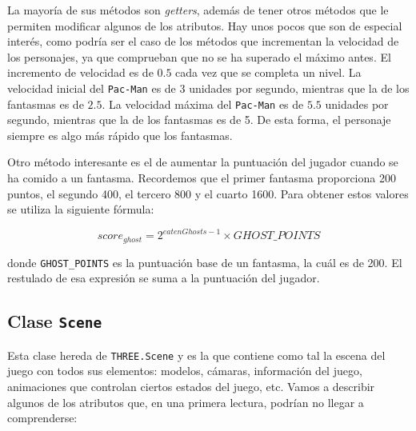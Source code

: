 \documentclass[11pt,a4paper]{article}
\begin{document}
La mayoría de sus métodos son \textit{getters}, además de tener otros métodos que le
permiten modificar algunos de los atributos. Hay unos pocos que son de especial interés, como
podría ser el caso de los métodos que incrementan la velocidad de los personajes, ya que
comprueban que no se ha superado el máximo antes. El incremento de velocidad es de $0.5$ cada
vez que se completa un nivel. La velocidad inicial del \texttt{Pac-Man} es de 3 unidades por
segundo, mientras que la de los fantasmas es de $2.5$. La velocidad máxima del \texttt{Pac-Man} es
de $5.5$ unidades por segundo, mientras que la de los fantasmas es de 5. De esta forma, el
personaje siempre es algo más rápido que los fantasmas.

Otro método interesante es el de aumentar la puntuación del jugador cuando se ha comido a un
fantasma. Recordemos que el primer fantasma proporciona 200 puntos, el segundo 400, el tercero 800
y el cuarto 1600. Para obtener estos valores se utiliza la siguiente fórmula:

\begin{equation}
score_{ghost} = 2^{eatenGhosts - 1} \times GHOST\_POINTS
\end{equation}

\noindent donde \texttt{GHOST\_POINTS} es la puntuación base de un fantasma, la cuál es de 200.
El restulado de esa expresión se suma a la puntuación del jugador.

\subsection{Clase \texttt{Scene}}

Esta clase hereda de \texttt{THREE.Scene} y es la que contiene como tal la escena del juego
con todos sus elementos: modelos, cámaras, información del juego, animaciones que controlan
ciertos estados del juego, etc. Vamos a describir algunos de los atributos que, en una primera
lectura, podrían no llegar a comprenderse:
\end{document}
